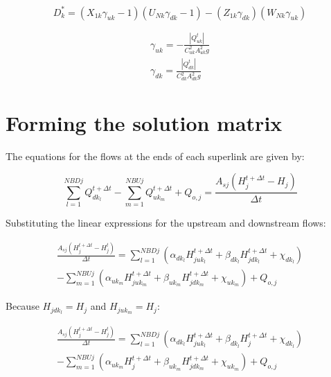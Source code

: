 \documentclass[11pt]{article}
\begin{document}
\begin{equation}
  D_k^* = (X_{1k} \gamma_{uk} - 1)(U_{Nk} \gamma_{dk} - 1) - (Z_{1k} \gamma_{dk})(W_{Nk} \gamma_{uk})
\end{equation}

\begin{align}
  \gamma_{uk} = -\frac{|Q_{uk}^{t}|}{C_{uk}^2 A_{uk}^2 g} \\
  \gamma_{dk} = \frac{|Q_{dk}^{t}|}{C_{dk}^2 A_{dk}^2 g}
\end{align}

\section*{Forming the solution matrix}

The equations for the flows at the ends of each superlink are given by:

\begin{equation}
  \sum_{l=1}^{NBDj} Q_{dk_l}^{t + \Delta t} - \sum_{m=1}^{NBUj} Q_{uk_m}^{t + \Delta t} + Q_{o,j} = \frac{A_{sj} (H_j^{t + \Delta t} - H_j)}{\Delta t}
\end{equation}

Substituting the linear expressions for the upstream and downstream flows:

\begin{equation}
  \begin{split}
    \frac{A_{sj} (H_j^{t + \Delta t} - H_j^t)}{\Delta t} =
    \sum_{l=1}^{NBDj} (\alpha_{dk_l} H_{juk_l}^{t + \Delta t} + \beta_{dk_l}
    H_{jdk_l}^{t + \Delta t} + \chi_{dk_l}) \\
    - \sum_{m=1}^{NBUj} (\alpha_{uk_m}
    H_{juk_m}^{t + \Delta t} + \beta_{uk_m} H_{jdk_m}^{t + \Delta t} + \chi_{uk_m}) +
    Q_{o,j}
  \end{split}
\end{equation}

Because $H_{jdk_l} = H_j$ and $H_{juk_m} = H_j$:

\begin{equation}
  \begin{split}
    \frac{A_{sj} (H_j^{t + \Delta t} - H_j^t)}{\Delta t} =
    \sum_{l=1}^{NBDj} (\alpha_{dk_l} H_{juk_l}^{t + \Delta t} + \beta_{dk_l}
    H_{j}^{t + \Delta t} + \chi_{dk_l})\\
    - \sum_{m=1}^{NBUj} (\alpha_{uk_m}
    H_{j}^{t + \Delta t} + \beta_{uk_m} H_{jdk_m}^{t + \Delta t} + \chi_{uk_m}) +
    Q_{o,j}
  \end{split}
\end{equation}
\end{document}
